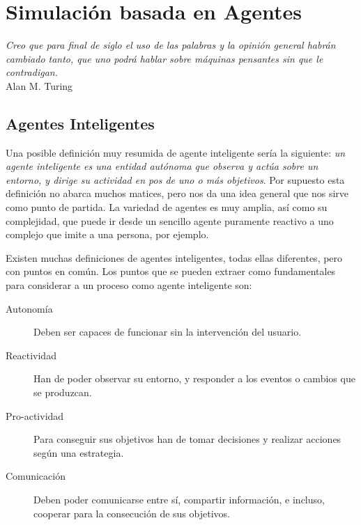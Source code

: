 
\chapter*{Simulación basada en Agentes} \label{cap1}


\begin{flushright}
\begin{minipage}{7.85cm}
    {\em Creo que para final de siglo el uso de las palabras y la opinión
    general habrán cambiado tanto, que uno podrá hablar sobre máquinas pensantes
    sin que le contradigan.} \\ Alan M. Turing
\end{minipage}
\end{flushright}

\vspace*{5mm}

\section*{Agentes Inteligentes}


Una posible definición muy resumida de agente inteligente sería la siguiente:
{\em un agente inteligente es una entidad autónoma que observa y actúa sobre un
entorno, y dirige su actividad en pos de uno o más objetivos}. Por supuesto
esta definición no abarca muchos matices, pero nos da una idea general que nos
sirve como punto de partida. La variedad de agentes es muy amplia, así como
su complejidad, que puede ir desde un sencillo agente puramente reactivo a uno
complejo que imite a una persona, por ejemplo.

Existen muchas definiciones de agentes inteligentes, todas ellas diferentes,
pero con puntos en común. Los puntos que se pueden extraer como fundamentales
para considerar a un proceso como agente inteligente son:

\begin{description}
 \item[Autonomía]Deben ser capaces de funcionar sin la intervención del usuario.
 \item[Reactividad]Han de poder observar su entorno, y responder a los eventos
 o cambios que se produzcan.
 \item[Pro-actividad]Para conseguir sus objetivos han de tomar decisiones y
 realizar acciones según una estrategia.
 \item[Comunicación]Deben poder comunicarse entre sí, compartir información, e
 incluso, cooperar para la consecución de sus objetivos.
\end{description}

